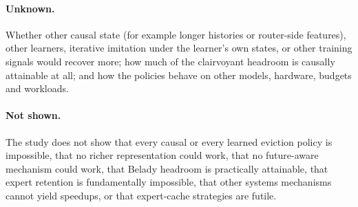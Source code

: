 \documentclass[11pt]{article}
\theoremstyle{plain}
\theoremstyle{definition}
\begin{document}
\paragraph{Unknown.} Whether other causal state (for example longer histories or router-side features), other learners, iterative imitation under the learner's own states, or other training signals would recover more; how much of the clairvoyant headroom is causally attainable at all; and how the policies behave on other models, hardware, budgets and workloads.
\paragraph{Not shown.} The study does not show that every causal or every learned eviction policy is impossible, that no richer representation could work, that no future-aware mechanism could work, that Belady headroom is practically attainable, that expert retention is fundamentally impossible, that other systems mechanisms cannot yield speedups, or that expert-cache strategies are futile.
\end{document}
